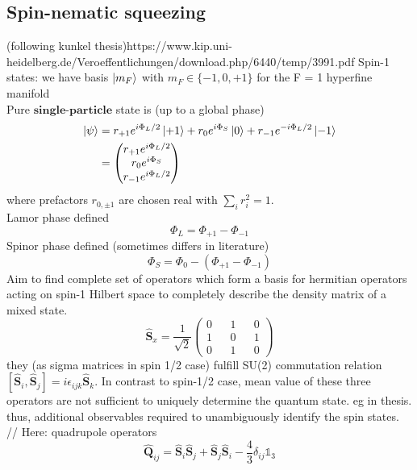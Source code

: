 \subsection{Spin-nematic squeezing}\label{sec:fou_spin_nematic_squeezing} (following kunkel thesis)https://www.kip.uni-heidelberg.de/Veroeffentlichungen/download.php/6440/temp/3991.pdf
Spin-1 states: we have basis $\ket{m_F}$ with $m_F \in \{-1,0,+1\}$ for the F = 1 hyperfine manifold
\\ 
Pure $\textbf{single-particle}$ state is (up to a global phase)
\begin{align}
	\ket{\psi} &= r_{+1} e^{i \Phi_L /2} \ket{+1} + r_0 e^{i\Phi_S} \ket{0} + r_{-1} e^{-i \Phi_L /2} \ket{-1}
	\\
	& = \left (
	\begin{matrix}
		r_{+1}e^{i \Phi_L/2}
		\\
		r_0 e^{i\Phi_S}
		\\
		r_{-1} e^{i \Phi_L/2}
	\end{matrix} \right )
\end{align}
where prefactors $r_{0,\pm 1}$ are chosen real with $\sum_i r_i^2 = 1$. 
\\
Lamor phase defined
\begin{equation}
	\Phi_L = \Phi_{+1}- \Phi_{-1}
\end{equation}
Spinor phase defined (sometimes differs in literature)
\begin{equation}
	\Phi_S = \Phi_0 - ( \Phi_{+1} - \Phi_{-1})
\end{equation}
Aim to find complete set of operators which form a basis for hermitian operators acting on spin-1 Hilbert space to completely describe the density matrix of a mixed state. 
\begin{equation}
	\hat{\bm{S}}_x = \frac{1}{\sqrt{2}}\left( 
		\begin{matrix}
				0 && 1 && 0
				\\
				1 && 0 && 1
				\\
				0 && 1 && 0
		\end{matrix} \right)
\end{equation}
they (as sigma matrices in spin 1/2 case) fulfill SU(2) commutation relation $[\hat{\bm{S}}_i,\hat{\bm{S}}_j] =i \epsilon_{ijk} \hat{\bm{S}}_k$. In contrast to spin-1/2 case, mean value of these three operators are not sufficient to uniquely determine the quantum state. eg in thesis. thus, additional observables required to unambiguously identify the spin states.
//
Here: quadrupole operators
\begin{equation}\label{eq:fou_def_quadrupole_operators}
	\hat{\bm{Q}}_{ij} = \hat{\bm{S}}_i \hat{\bm{S}}_j + \hat{\bm{S}}_j \hat{\bm{S}}_i - \frac{4}{3} \delta_{ij} \mathds{1}_3
\end{equation}
